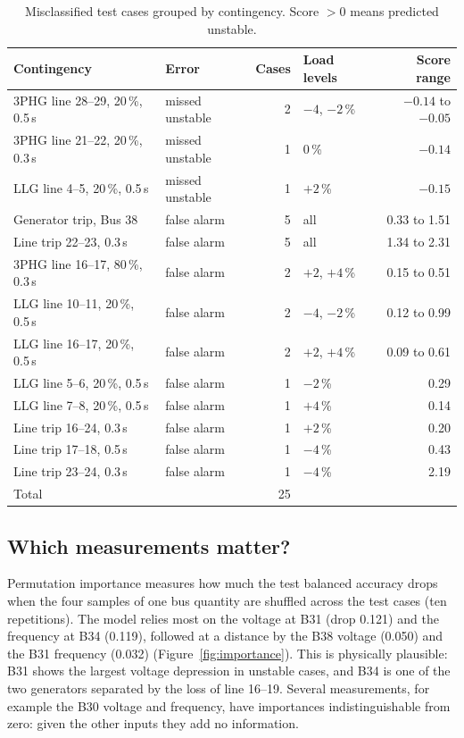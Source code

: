 \documentclass[11pt,a4paper]{article}
\begin{document}
\begin{table}[htbp]
\centering
\small
\caption{Misclassified test cases grouped by contingency. Score $>0$ means predicted unstable.}
\label{tab:testerrors}
\begin{tabular}{llrlr}
\toprule
Contingency & Error & Cases & Load levels & Score range \\
\midrule
3PHG line 28--29, 20\,\%, 0.5\,s  & missed unstable & 2 & $-4$, $-2$\,\%  & $-0.14$ to $-0.05$ \\
3PHG line 21--22, 20\,\%, 0.3\,s  & missed unstable & 1 & 0\,\%           & $-0.14$ \\
LLG line 4--5, 20\,\%, 0.5\,s     & missed unstable & 1 & $+2$\,\%        & $-0.15$ \\
\midrule
Generator trip, Bus 38            & false alarm & 5 & all              & 0.33 to 1.51 \\
Line trip 22--23, 0.3\,s          & false alarm & 5 & all              & 1.34 to 2.31 \\
3PHG line 16--17, 80\,\%, 0.3\,s  & false alarm & 2 & $+2$, $+4$\,\%   & 0.15 to 0.51 \\
LLG line 10--11, 20\,\%, 0.5\,s   & false alarm & 2 & $-4$, $-2$\,\%   & 0.12 to 0.99 \\
LLG line 16--17, 20\,\%, 0.5\,s   & false alarm & 2 & $+2$, $+4$\,\%   & 0.09 to 0.61 \\
LLG line 5--6, 20\,\%, 0.5\,s     & false alarm & 1 & $-2$\,\%         & 0.29 \\
LLG line 7--8, 20\,\%, 0.5\,s     & false alarm & 1 & $+4$\,\%         & 0.14 \\
Line trip 16--24, 0.3\,s          & false alarm & 1 & $+2$\,\%         & 0.20 \\
Line trip 17--18, 0.5\,s          & false alarm & 1 & $-4$\,\%         & 0.43 \\
Line trip 23--24, 0.3\,s          & false alarm & 1 & $-4$\,\%         & 2.19 \\
\midrule
Total & & 25 & & \\
\bottomrule
\end{tabular}
\end{table}

\subsection{Which measurements matter?}
Permutation importance measures how much the test balanced accuracy drops when the four samples of one bus
quantity are shuffled across the test cases (ten repetitions). The model relies most on the voltage at B31 (drop
0.121) and the frequency at B34 (0.119), followed at a distance by the B38 voltage (0.050) and the B31 frequency (0.032)
(Figure~\ref{fig:importance}). This is physically plausible: B31 shows the largest voltage depression in unstable cases,
and B34 is one of the two generators separated by the loss of line 16--19. Several measurements, for example the B30
voltage and frequency, have importances indistinguishable from zero: given the other inputs they add no information.
\end{document}
